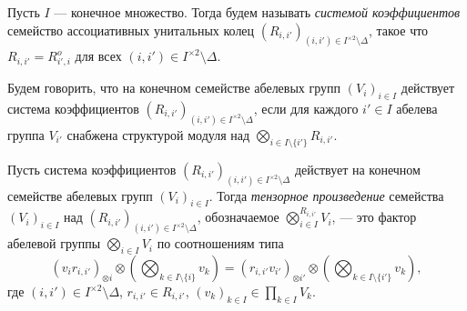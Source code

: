 \documentclass[
	extrafontsizes,
	11pt,
	hyphens,
]{memoir}
\begin{document}
\begin{definition}
Пусть \(I\) --- конечное множество.
\label{def:TensorSysCoeff}
Тогда будем называть \emph{системой коэффициентов} семейство ассоциативных унитальных колец \((R_{i,i'})_{(i,i') \in I^{\times 2} \setminus \Delta}\), такое что \(R_{i,i'} = R_{i',i}^o\) для всех \((i,i') \in I^{\times 2} \setminus \Delta\).
\end{definition}

\begin{definition}
\label{def:TensorSysCoeffAct}
Будем говорить, что на конечном семействе абелевых групп \((V_i)_{i \in I}\) действует система коэффициентов \((R_{i,i'})_{(i,i') \in I^{\times 2} \setminus \Delta}\), если для каждого \(i' \in I\) абелева группа \(V_{i'}\) снабжена
структурой модуля над \(\bigotimes_{i \in I \setminus \{i'\}} R_{i,i'}\).
\end{definition}

\begin{definition}
Пусть система коэффициентов \((R_{i,i'})_{(i,i') \in I^{\times 2} \setminus \Delta}\) действует на конечном семействе абелевых групп \((V_i)_{i \in I}\).
\label{def:TensorGenProdCoeff}
Тогда
\emph{тензорное произведение} семейства \((V_i)_{i \in I}\) над \((R_{i,i'})_{(i,i') \in I^{\times 2} \setminus \Delta}\),
обозначаемое
\(\bigotimes^{R_{i,i'}}_{i \in I} V_i\),
--- это фактор абелевой группы \(\bigotimes_{i \in I} V_i\) по соотношениям типа
\[
\textstyle
(v_i r_{i,i'})_{\otimes i} \otimes (\bigotimes_{k \in I \setminus \{i\}} v_k)
=
(r_{i,i'} v_{i'})_{\otimes i'} \otimes (\bigotimes_{k \in I \setminus \{i'\}} v_k),
\]
где \((i,i') \in I^{\times 2} \setminus \Delta\),
\(r_{i,i'} \in R_{i,i'}\),
\((v_k)_{k \in I} \in \prod_{k \in I} V_k\).
\end{definition}
\end{document}
